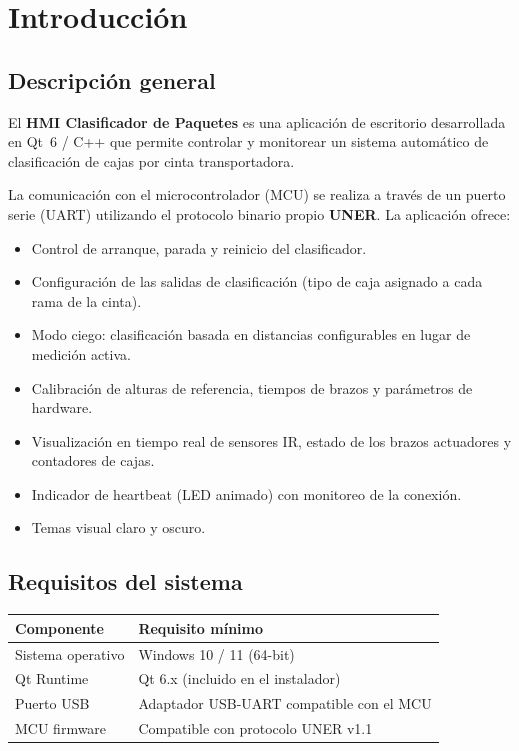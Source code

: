 \documentclass[12pt,a4paper]{report}
\begin{document}
\chapter{Introducción}

\section{Descripción general}

El \textbf{HMI Clasificador de Paquetes} es una aplicación de escritorio
desarrollada en Qt~6 / C++ que permite controlar y monitorear un sistema
automático de clasificación de cajas por cinta transportadora.

La comunicación con el microcontrolador (MCU) se realiza a través de un
puerto serie (UART) utilizando el protocolo binario propio \textbf{UNER}.
La aplicación ofrece:

\begin{itemize}
  \item Control de arranque, parada y reinicio del clasificador.
  \item Configuración de las salidas de clasificación (tipo de caja asignado a
        cada rama de la cinta).
  \item Modo ciego: clasificación basada en distancias configurables en lugar de
        medición activa.
  \item Calibración de alturas de referencia, tiempos de brazos y parámetros
        de hardware.
  \item Visualización en tiempo real de sensores IR, estado de los brazos
        actuadores y contadores de cajas.
  \item Indicador de heartbeat (LED animado) con monitoreo de la conexión.
  \item Temas visual claro y oscuro.
\end{itemize}

\section{Requisitos del sistema}

\begin{tabular}{ll}
  \toprule
  \textbf{Componente} & \textbf{Requisito mínimo} \\
  \midrule
  Sistema operativo & Windows 10 / 11 (64-bit) \\
  Qt Runtime & Qt 6.x (incluido en el instalador) \\
  Puerto USB & Adaptador USB-UART compatible con el MCU \\
  MCU firmware & Compatible con protocolo UNER v1.1 \\
  \bottomrule
\end{tabular}
\end{document}
